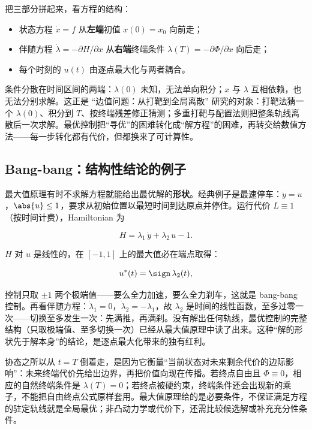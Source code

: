 把三部分拼起来，看方程的结构：

\begin{itemize}
\tightlist
\item
  状态方程 \(\dot x=f\) 从\textbf{左端}初值 \(x(0)=x_0\) 向前走；
\item
  伴随方程 \(\dot\lambda=-\partial H/\partial x\) 从\textbf{右端}终端条件 \(\lambda(T)=-\partial\Phi/\partial x\) 向后走；
\item
  每个时刻的 \(u(t)\) 由逐点最大化与两者耦合。
\end{itemize}

条件分散在时间区间的两端：\(\lambda(0)\) 未知，无法单向积分；\(x\) 与 \(\lambda\) 互相依赖，也无法分别求解。这正是 ``边值问题：从打靶到全局离散'' 研究的对象：打靶法猜一个 \(\lambda(0)\)、积分到 \(T\)、按终端残差修正猜测；多重打靶与配置法则把整条轨线离散后一次求解。最优控制把``寻优''的困难转化成``解方程''的困难，再转交给数值方法——每一步转化都有代价，但都换来了可计算性。

\subsection{Bang-bang：结构性结论的例子}

最大值原理有时不求解方程就能给出最优解的\textbf{形状}。经典例子是最速停车：\(\ddot y=u\)，\(\abs{u}\le1\)，要求从初始位置以最短时间到达原点并停住。运行代价 \(L\equiv1\)（按时间计费），Hamiltonian 为

\[
H=\lambda_1\,\dot y+\lambda_2\,u-1.
\]

\(H\) 对 \(u\) 是线性的，在 \([-1,1]\) 上的最大值必在端点取得：

\[
u^\ast(t)=\sign\,\lambda_2(t),
\]

控制只取 \(\pm1\) 两个极端值——要么全力加速，要么全力刹车，这就是 bang-bang 控制。再看伴随方程：\(\dot\lambda_1=0\)，\(\dot\lambda_2=-\lambda_1\)，故 \(\lambda_2\) 是时间的线性函数，至多过零一次——切换至多发生一次：先满推，再满刹。没有解出任何轨线，最优控制的完整结构（只取极端值、至多切换一次）已经从最大值原理中读了出来。这种``解的形状先于解本身''的结论，是逐点最大化带来的独有红利。

协态之所以从 \(t=T\) 倒着走，是因为它衡量``当前状态对未来剩余代价的边际影响''：未来终端代价先给出边界，再把价值向现在传播。若终点自由且 \(\Phi\equiv0\)，相应的自然终端条件是 \(\lambda(T)=0\)；若终点被硬约束，终端条件还会出现新的乘子，不能把自由终点公式原样套用。最大值原理给的是必要条件，不保证满足方程的驻定轨线就是全局最优；非凸动力学或代价下，还需比较候选解或补充充分性条件。
